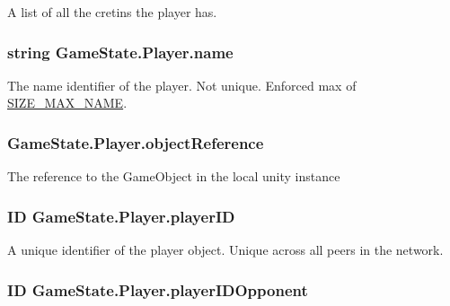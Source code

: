 A list of all the cretins the player has. 

\hypertarget{class_game_state_1_1_player_afc2b145df544ca5bffc7c87ef294bcde}{
\subsubsection[{name}]{\setlength{\rightskip}{0pt plus 5cm}string Game\-State.\-Player.\-name}}\label{class_game_state_1_1_player_afc2b145df544ca5bffc7c87ef294bcde}


The name identifier of the player. Not unique. Enforced max of \hyperlink{class_game_state_1_1_player_a1cdc9de8183b220e87632f7f6a7147d0}{S\-I\-Z\-E\-\_\-\-M\-A\-X\-\_\-\-N\-A\-M\-E}. 

\hypertarget{class_game_state_1_1_player_aebf24de01e14055dc940d0493753484f}{
\subsubsection[{object\-Reference}]{ Game\-State.\-Player.\-object\-Reference}}\label{class_game_state_1_1_player_aebf24de01e14055dc940d0493753484f}


The reference to the Game\-Object in the local unity instance 

\hypertarget{class_game_state_1_1_player_acbd28d89e6eb8611aa66452ec31e9133}{
\subsubsection[{player\-I\-D}]{\setlength{\rightskip}{0pt plus 5cm}I\-D Game\-State.\-Player.\-player\-I\-D}}\label{class_game_state_1_1_player_acbd28d89e6eb8611aa66452ec31e9133}


A unique identifier of the player object. Unique across all peers in the network. 

\hypertarget{class_game_state_1_1_player_aaed188c94b7f6be4dabe39744aa818ca}{
\subsubsection[{player\-I\-D\-Opponent}]{\setlength{\rightskip}{0pt plus 5cm}I\-D Game\-State.\-Player.\-player\-I\-D\-Opponent}}\label{class_game_state_1_1_player_aaed188c94b7f6be4dabe39744aa818ca}


